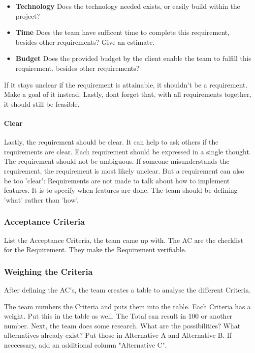 \documentclass[10pt]{report}
\begin{document}
\begin{itemize}
	\item \textbf{Technology} Does the technology needed exists, or easily build within the project?
	\item \textbf{Time} Does the team have sufficent time to complete this requirement, besides other requirements? Give an estimate.
	\item \textbf{Budget} Does the provided budget by the client enable the team to fulfill this requirement, besides other requirements?
\end{itemize}

If it stays unclear if the requirement is attainable, it shouldn't be a requirement. Make a goal of it instead. Lastly, dont forget that, with all requirements together, it should still be feasible.

\paragraph{Clear}

Lastly, the requirement should be clear. It can help to ask others if the requirements are clear. Each requirement should be expressed in a single thought. The requirement should not be ambiguous. If someone misunderstands the requirement, the requirement is most likely unclear. But a requirement can also be too 'clear': Requirements are not made to talk about how to implement features. It is to specify when features are done. The team should be defining 'what' rather than 'how'.

\subsubsection{Acceptance Criteria}

List the Acceptance Criteria, the team came up with. The AC are the checklist for the Requirement. They make the Requirement verifiable.

\subsubsection{Weighing the Criteria}

After defining the AC's, the team creates a table to analyse the different Criteria.

The team numbers the Criteria and puts them into the table. Each Criteria has a weight. Put this in the table as well. The Total can result in 100 or another number. Next, the team does some research. What are the possibilities? What alternatives already exist? Put those in Alternative A and Alternative B. If neccessary, add an additional column "Alternative C".
\end{document}
